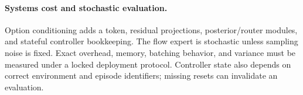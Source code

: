 \paragraph{Systems cost and stochastic evaluation.}
Option conditioning adds a token, residual projections, posterior/router
modules, and stateful controller bookkeeping.  The flow expert is stochastic
unless sampling noise is fixed.  Exact overhead, memory, batching behavior, and
variance must be measured under a locked deployment protocol.  Controller
state also depends on correct environment and episode identifiers; missing
resets can invalidate an evaluation.
